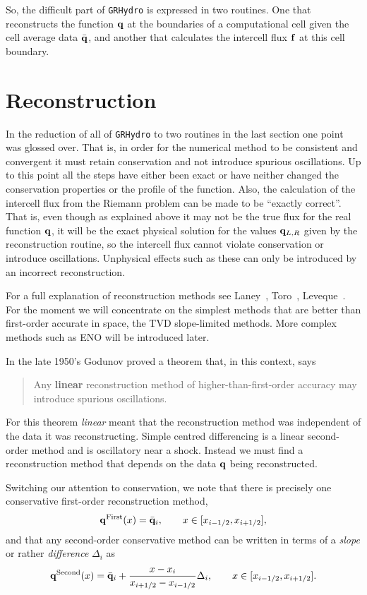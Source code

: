 \documentclass{article}
\begin{document}
So, the difficult part of {\tt GRHydro} is expressed in two routines. One that
reconstructs the function ${\bf q}$ at the boundaries of a
computational cell given the cell average data $\bar{{\bf q}}$, and
another that calculates the intercell flux ${\bf f}$ at this cell
boundary. 

\section{Reconstruction}
\label{sec:recon}

In the reduction of all of {\tt GRHydro} to two routines in the last section
one point was glossed over. That is, in order for the numerical method
to be consistent and convergent it must retain conservation and not
introduce spurious oscillations. Up to this point all the steps have
either been exact or have neither changed the conservation properties
or the profile of the function. Also, the calculation of the intercell
flux from the Riemann problem can be made to be ``exactly correct''.
That is, even though as explained above it may not be the true flux
for the real function ${\bf q}$, it will be the exact physical
solution for the values ${\bf q}_{L,R}$ given by the reconstruction
routine, so the intercell flux cannot violate conservation or
introduce oscillations.  Unphysical effects such as these can only be
introduced by an incorrect reconstruction.

For a full explanation of reconstruction methods see
Laney~\cite{laney}, Toro~\cite{toro}, Leveque~\cite{leveque}. For the
moment we will concentrate on the simplest methods that are better
than first-order accurate in space, the TVD slope-limited methods.
More complex methods such as ENO will be introduced later.

In the late 1950's Godunov proved a theorem that, in this context,
says
\begin{quote}
Any {\bf linear} reconstruction method of higher-than-first-order
accuracy may introduce spurious oscillations.
\end{quote}
For this theorem {\it linear} meant that the reconstruction method was
independent of the data it was reconstructing. Simple centred
differencing is a linear second-order method and is oscillatory near a
shock. Instead we must find a reconstruction method that depends on
the data ${\bf q}$ being reconstructed.

Switching our attention to conservation, we note that there is
precisely one conservative first-order reconstruction method,
\begin{equation}
  \label{eq:reconfirst}
  {\bf q}^{{\rm First}}(x) = \bar{{\bf q}}_i, \qquad x \in [
  x_{i-1/2}, x_{i+1/2} ], 
\end{equation}
and that any second-order conservative method can be written in terms
of a {\it slope} or rather \emph{difference} $\Delta_i$ as
\begin{equation}
  \label{eq:reconsecond}
  {\bf q}^{{\rm Second}}(x) = \bar{{\bf q}}_i + \frac{x -
  x_i}{x_{i+1/2} - x_{i-1/2}} \Delta_i, \qquad x \in [ x_{i-1/2}, x_{i+1/2} ].
\end{equation}
\end{document}
